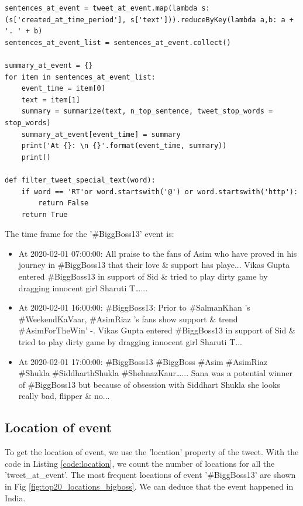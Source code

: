\begin{lstlisting}[caption=Time frame of an event, label={code:timeFrame}]
sentences_at_event = tweet_at_event.map(lambda s: (s['created_at_time_period'], s['text'])).reduceByKey(lambda a,b: a + '. ' + b)
sentences_at_event_list = sentences_at_event.collect()

summary_at_event = {}
for item in sentences_at_event_list:
    event_time = item[0]
    text = item[1]
    summary = summarize(text, n_top_sentence, tweet_stop_words = stop_words)
    summary_at_event[event_time] = summary
    print('At {}: \n {}'.format(event_time, summary))
    print()
    
def filter_tweet_special_text(word):
    if word == 'RT'or word.startswith('@') or word.startswith('http'):
        return False
    return True
\end{lstlisting}

The time frame for the '\#BiggBoss13' event is:

\begin{itemize}
    \item At 2020-02-01 07:00:00:  All praise  to the fans of Asim who have proved in his journey in \#BiggBoss13  that their love \& support has playe... Vikas Gupta entered \#BiggBoss13 in support of Sid  \& tried to play dirty game by dragging  innocent girl Sharuti T…... 
    \item At 2020-02-01 16:00:00:   \#BiggBoss13: Prior to \#SalmanKhan ’s \#WeekendKaVaar, \#AsimRiaz ’s fans show support \& trend \#AsimForTheWin’ -. Vikas Gupta entered \#BiggBoss13 in support of Sid  \& tried to play dirty game by dragging  innocent girl Sharuti T... 
    \item At 2020-02-01 17:00:00: \#BiggBoss13 \#BiggBoss \#Asim \#AsimRiaz \#Shukla \#SiddharthShukla \#ShehnazKaur…... Sana was a potential winner of \#BiggBoss13 but because of obsession with Siddhart Shukla she looks really bad, flipper \& no... 

\end{itemize}


\subsection{Location of event}

To get the location of event, we use the 'location' property of the tweet. With the code in Listing \ref{code:location}, we count the number of locations for all the 'tweet\_at\_event'. The most frequent locations of event '\#BiggBoss13' are shown in Fig \ref{fig:top20_locations_bigboss}. We can deduce that the event happened in India.

